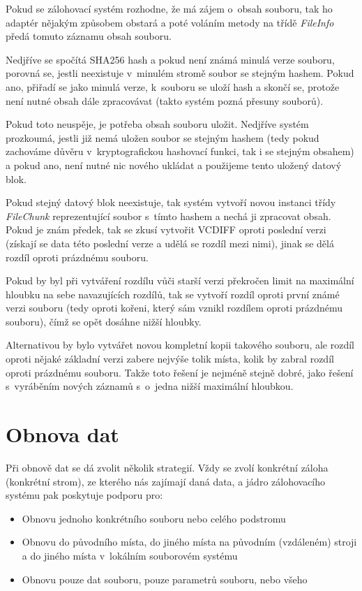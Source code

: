 Pokud se zálohovací systém rozhodne, že má zájem o~obsah souboru, tak ho adaptér
nějakým způsobem obstará a poté voláním metody na třídě {\it FileInfo} předá
tomuto záznamu obsah souboru.

Nedjříve se spočítá \gls{SHA256} hash a pokud není známá minulá verze souboru,
porovná se, jestli neexistuje v~minulém stromě soubor se stejným hashem. Pokud
ano, přiřadí se jako minulá verze, k~souboru se uloží hash a skončí se, protože
není nutné obsah dále zpracovávat (takto systém pozná přesuny souborů).

Pokud toto neuspěje, je potřeba obsah souboru uložit. Nedjříve systém prozkoumá,
jestli již nemá uložen soubor se stejným hashem (tedy pokud zachováme důvěru
v~kryptografickou hashovací funkci, tak i se stejným obsahem) a pokud ano, není
nutné nic nového ukládat a použijeme tento uložený datový blok.

Pokud stejný datový blok neexistuje, tak systém vytvoří novou instanci třídy
{\it FileChunk} reprezentující soubor s~tímto hashem a nechá ji zpracovat obsah.
Pokud je znám předek, tak se zkusí vytvořit \gls{VCDIFF} oproti poslední verzi
(získají se data této poslední verze a udělá se rozdíl mezi nimi), jinak se dělá
rozdíl oproti prázdnému souboru.

Pokud by byl při vytváření rozdílu vůči starší verzi překročen limit na maximální
hloubku na sebe navazujících rozdílů, tak se vytvoří rozdíl oproti první známé
verzi souboru (tedy oproti kořeni, který sám vznikl rozdílem oproti prázdnému
souboru), čímž se opět dosáhne nižší hloubky.

Alternativou by bylo vytvářet novou kompletní kopii takového souboru, ale rozdíl
oproti nějaké základní verzi zabere nejvýše tolik místa, kolik by zabral rozdíl
oproti prázdnému souboru. Takže toto řešení je nejméně stejně dobré, jako řešení
s~vyráběním nových záznamů s~o~jedna nižší maximální hloubkou.

\section{Obnova dat}

Při obnově dat se dá zvolit několik strategií. Vždy se zvolí konkrétní záloha
(konkrétní strom), ze kterého nás zajímají daná data, a jádro zálohovacího
systému pak poskytuje podporu pro:
\begin{itemize}
	\item Obnovu jednoho konkrétního souboru nebo celého podstromu
	\item Obnovu do původního místa, do jiného místa na původním (vzdáleném)
	stroji a do jiného místa v~lokálním souborovém systému
	\item Obnovu pouze dat souboru, pouze parametrů souboru, nebo všeho
\end{itemize}

